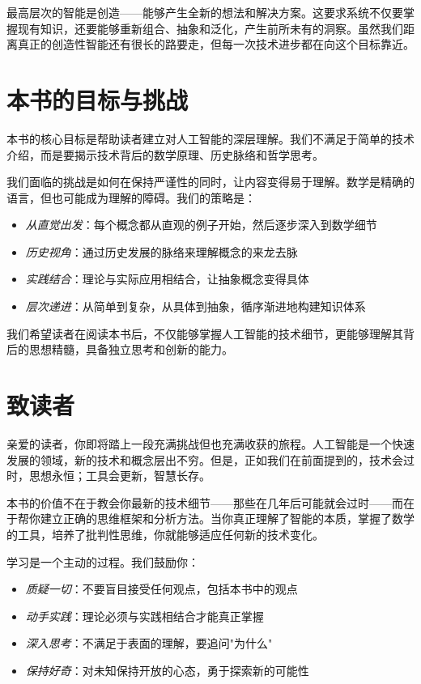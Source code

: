 最高层次的智能是创造——能够产生全新的想法和解决方案。这要求系统不仅要掌握现有知识，还要能够重新组合、抽象和泛化，产生前所未有的洞察。虽然我们距离真正的创造性智能还有很长的路要走，但每一次技术进步都在向这个目标靠近。

\section{本书的目标与挑战}

本书的核心目标是帮助读者建立对人工智能的深层理解。我们不满足于简单的技术介绍，而是要揭示技术背后的数学原理、历史脉络和哲学思考。

我们面临的挑战是如何在保持严谨性的同时，让内容变得易于理解。数学是精确的语言，但也可能成为理解的障碍。我们的策略是：
\begin{itemize}
\item \emph{从直觉出发}：每个概念都从直观的例子开始，然后逐步深入到数学细节
\item \emph{历史视角}：通过历史发展的脉络来理解概念的来龙去脉
\item \emph{实践结合}：理论与实际应用相结合，让抽象概念变得具体
\item \emph{层次递进}：从简单到复杂，从具体到抽象，循序渐进地构建知识体系
\end{itemize}

我们希望读者在阅读本书后，不仅能够掌握人工智能的技术细节，更能够理解其背后的思想精髓，具备独立思考和创新的能力。

\section{致读者}

亲爱的读者，你即将踏上一段充满挑战但也充满收获的旅程。人工智能是一个快速发展的领域，新的技术和概念层出不穷。但是，正如我们在前面提到的，技术会过时，思想永恒；工具会更新，智慧长存。

本书的价值不在于教会你最新的技术细节——那些在几年后可能就会过时——而在于帮你建立正确的思维框架和分析方法。当你真正理解了智能的本质，掌握了数学的工具，培养了批判性思维，你就能够适应任何新的技术变化。

学习是一个主动的过程。我们鼓励你：
\begin{itemize}
\item \emph{质疑一切}：不要盲目接受任何观点，包括本书中的观点
\item \emph{动手实践}：理论必须与实践相结合才能真正掌握
\item \emph{深入思考}：不满足于表面的理解，要追问"为什么"
\item \emph{保持好奇}：对未知保持开放的心态，勇于探索新的可能性
\end{itemize}

